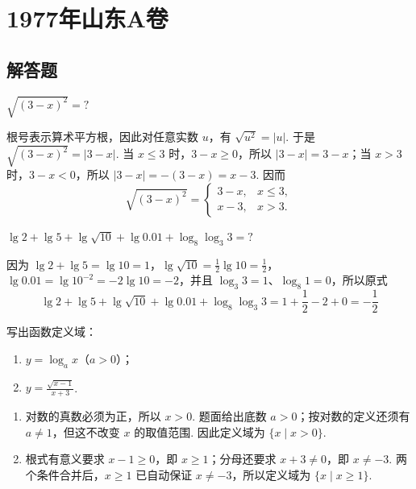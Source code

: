 \chapter{1977年山东A卷}

\section{解答题}

\begin{problem}
\(\sqrt{\left( 3-x \right)^2}=?\)
\end{problem}

\begin{solution}
根号表示算术平方根，因此对任意实数 \(u\)，有 \(\sqrt{u^2}=\lvert u\rvert\). 于是
\(\sqrt{\left( 3-x \right)^2}=\lvert 3-x\rvert\). 当 \(x\le 3\) 时，\(3-x\ge 0\)，所以 \(\lvert 3-x\rvert=3-x\)；当 \(x>3\) 时，\(3-x<0\)，所以 \(\lvert 3-x\rvert=-(3-x)=x-3\). 因而
\[
\sqrt{\left( 3-x \right)^2}=
\begin{cases}
3-x, & x\le 3,\\
x-3, & x>3.
\end{cases}
\]
\end{solution}

\begin{problem}
\(\lg 2+\lg 5+\lg \sqrt{10}+\lg 0.01+\log_8\log_3 3=?\)
\end{problem}

\begin{solution}
因为 \(\lg 2+\lg 5=\lg 10=1\)，\(\lg\sqrt{10}=\frac12\lg 10=\frac12\)，\(\lg 0.01=\lg 10^{-2}=-2\lg 10=-2\)，并且 \(\log_3 3=1\)、\(\log_8 1=0\)，所以原式
\[
\lg 2+\lg 5+\lg\sqrt{10}+\lg 0.01+\log_8\log_3 3=1+\frac12-2+0=-\frac12
\]
\end{solution}

\begin{problem}
写出函数定义域：

\begin{enumerate}
\item \(y=\log_a x\)（\(a>0\)）；
\item \(y=\frac{\sqrt{x-1}}{x+3}\).
\end{enumerate}
\end{problem}

\begin{solution}
\begin{enumerate}
\item 对数的真数必须为正，所以 \(x>0\). 题面给出底数 \(a>0\)；按对数的定义还须有 \(a\ne 1\)，但这不改变 \(x\) 的取值范围. 因此定义域为 \(\{x\mid x>0\}\).
\item 根式有意义要求 \(x-1\ge 0\)，即 \(x\ge 1\)；分母还要求 \(x+3\ne 0\)，即 \(x\ne -3\). 两个条件合并后，\(x\ge 1\) 已自动保证 \(x\ne -3\)，所以定义域为 \(\{x\mid x\ge 1\}\).
\end{enumerate}
\end{solution}


